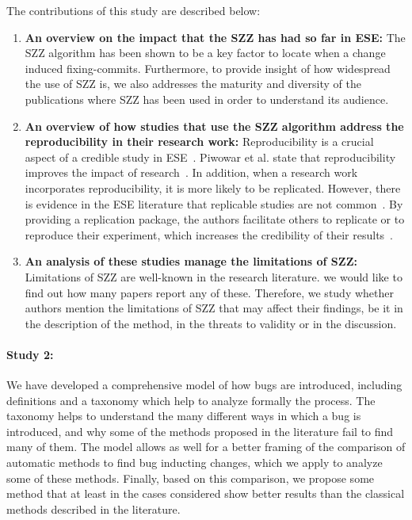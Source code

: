\documentclass[a4paper, 12pt]{book}
\begin{document}
The contributions of this study are described below:
\begin{enumerate}
  \item \textbf{An overview on the impact that the SZZ has had so far in ESE:} The SZZ algorithm has been shown to be a key factor to locate when a change induced fixing-commits. Furthermore, to provide insight of how widespread the use of SZZ is, we also addresses the maturity and diversity of the publications where SZZ has been used in order to understand its audience.
  \item \textbf{An overview of how studies that use the SZZ algorithm address the reproducibility in their research work:} Reproducibility is a crucial aspect of a credible study in ESE~\cite{gonzalez2012reproducibility}. Piwowar et al. state that reproducibility improves the impact of research~\cite{piwowar2007sharing}. In addition, when a research work incorporates reproducibility, it is more likely to be replicated. However, there is evidence in the ESE literature that replicable studies are not common~\cite{robles2010replicating}. By providing a replication package, the authors facilitate others to replicate or to reproduce their experiment, which increases the credibility of their results~\cite{juristo2009using}.
  \item \textbf{An analysis of these studies manage the limitations of SZZ:} Limitations of SZZ are well-known in the research literature. we would like to find out how many papers report any of these. Therefore, we study whether authors mention the limitations of SZZ that may affect their findings, be it in the description of the method, in the threats to validity or in the discussion.
\end{enumerate}

\paragraph{Study 2:}
We have developed a comprehensive model of how bugs are introduced, including definitions and a taxonomy which help to analyze formally the process. The taxonomy helps to understand the many different ways in which a bug is introduced, and why some of the methods proposed in the literature fail to find many of them. The model allows as well for a better framing of the comparison of automatic methods to find bug inducting changes, which we apply to analyze some of these methods. Finally, based on this comparison, we propose some method that at least in the cases considered show better results than the classical methods described in the literature.
\end{document}
